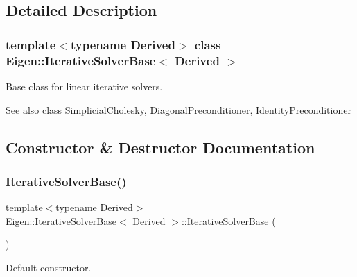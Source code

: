 \subsection{Detailed Description}
\subsubsection*{template$<$typename Derived$>$\newline
class Eigen\+::\+Iterative\+Solver\+Base$<$ Derived $>$}

Base class for linear iterative solvers. 

\begin{DoxySeeAlso}{See also}
class \mbox{\hyperlink{class_eigen_1_1_simplicial_cholesky}{Simplicial\+Cholesky}}, \mbox{\hyperlink{class_eigen_1_1_diagonal_preconditioner}{Diagonal\+Preconditioner}}, \mbox{\hyperlink{class_eigen_1_1_identity_preconditioner}{Identity\+Preconditioner}} 
\end{DoxySeeAlso}


\subsection{Constructor \& Destructor Documentation}
\mbox{\label{class_eigen_1_1_iterative_solver_base_a0922f2be45082690d7734aa6732fc493}} 
\subsubsection{\texorpdfstring{IterativeSolverBase()}{IterativeSolverBase()}\hspace{0.1cm}{\footnotesize\ttfamily [1/2]}}
{\footnotesize\ttfamily template$<$typename Derived$>$ \\
\mbox{\hyperlink{class_eigen_1_1_iterative_solver_base}{Eigen\+::\+Iterative\+Solver\+Base}}$<$ Derived $>$\+::\mbox{\hyperlink{class_eigen_1_1_iterative_solver_base}{Iterative\+Solver\+Base}} (\begin{DoxyParamCaption}{ }\end{DoxyParamCaption})\hspace{0.3cm}{\ttfamily [inline]}}

Default constructor. \mbox{\label{class_eigen_1_1_iterative_solver_base_a3c68fe3cd929ea1ff8a0d4cbcd65ebad}} 
